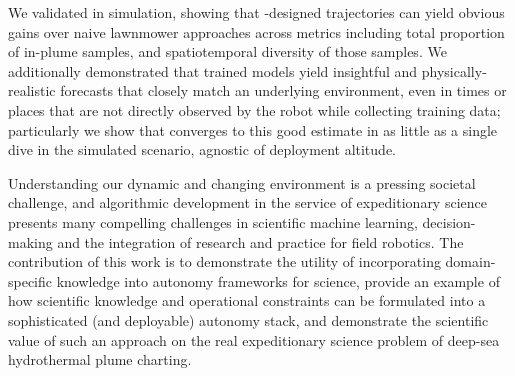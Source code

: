 We validated \PHORTEX in simulation, showing that \PHORTEX-designed trajectories can yield obvious gains over naive lawnmower approaches across metrics including total proportion of in-plume samples, and spatiotemporal diversity of those samples. We additionally demonstrated that trained \PHUMES models yield insightful and physically-realistic forecasts that closely match an underlying environment, even in times or places that are not directly observed by the robot while collecting training data; particularly we show that \PHUMES converges to this good estimate in as little as a single dive in the simulated scenario, agnostic of deployment altitude.

Understanding our dynamic and changing environment is a pressing societal challenge, and algorithmic development in the service of expeditionary science presents many compelling challenges in scientific machine learning, decision-making and the integration of research and practice for field robotics. The contribution of this work is to demonstrate the utility of incorporating domain-specific knowledge into autonomy frameworks for science, provide an example of how scientific knowledge and operational constraints can be formulated into a sophisticated (and deployable) autonomy stack, and demonstrate the scientific value of such an approach on the real expeditionary science problem of deep-sea hydrothermal plume charting.
